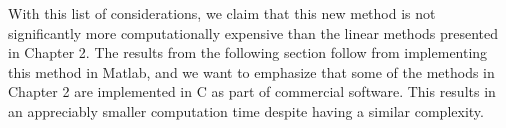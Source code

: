 With this list of considerations, we claim that this new method is not significantly more computationally expensive than the linear methods presented in Chapter 2.
%
The results from the following section follow from implementing this method in Matlab, and we want to emphasize that some of the methods in Chapter 2 are implemented in C as part of commercial software.
%
This results in an appreciably smaller computation time despite having a similar complexity.

